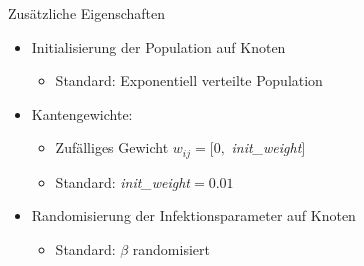 \begin{frame}{Zusätzliche Eigenschaften}
    \begin{itemize}
        \item Initialisierung der Population auf Knoten 
            \begin{itemize}
                \item Standard: Exponentiell verteilte Population
            \end{itemize}
        \vfill\item<2-> Kantengewichte:
            \begin{itemize}
                \item Zufälliges Gewicht $w_{ij} = [0,$ \emph{init\_weight}$]$
                \item Standard: \emph{init\_weight}$=0.01$
            \end{itemize}
        \vfill\item<3-> Randomisierung der Infektionsparameter auf Knoten
            \begin{itemize}
                \item Standard: $\beta$ randomisiert
            \end{itemize}
    \end{itemize}
\end{frame}

